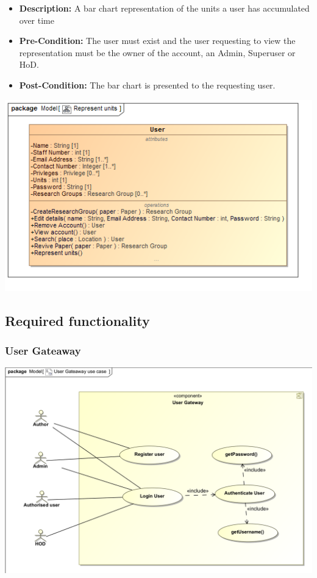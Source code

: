 \documentclass[11pt]{article}
\begin{document}
\begin{itemize}
		\begin{itemize}
			\item \textbf{Description: }A bar chart representation of the units a user has accumulated over time
			\item \textbf{Pre-Condition: }The user must exist and the user requesting to view the representation must be the owner of the account, an Admin, Superuser or HoD.
			\item \textbf{Post-Condition: }The bar chart is presented to the requesting user.
		\end{itemize}
		\begin{center}
			\includegraphics[width=\textwidth]{../DomainModel/Representunits.png}\\[0.5cm]
		\end{center}
	\end{itemize}
	
	\subsection{Required functionality}
	
	
	\subsubsection{User Gateaway}
	\begin{center}
		\includegraphics[width=\textwidth]{../Images/UserGateway_UseCase.png}\\[0.5cm]
	\end{center}
\end{document}
